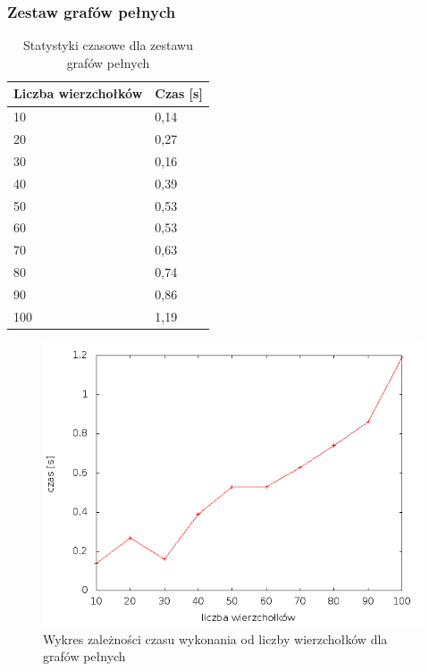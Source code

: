 \documentclass[12pt, a4paper]{article}
\begin{document}
\subsubsection*{Zestaw grafów pełnych}
\begin{table}[H]
\caption{Statystyki czasowe dla zestawu grafów pełnych}
\begin{center}
    \begin{tabular}{|l|l|}
    \hline
    Liczba wierzchołków & Czas [s] \\ \hline
    10 & 0,14 \\ \hline
    20 & 0,27 \\ \hline
    30 & 0,16 \\ \hline
    40 & 0,39 \\ \hline
    50 & 0,53 \\ \hline
    60 & 0,53 \\ \hline
    70 & 0,63 \\ \hline
    80 & 0,74 \\ \hline
    90 & 0,86 \\ \hline
    100 & 1,19 \\ \hline
    \end{tabular}
\end{center}
\end{table}

\begin{figure}[h]
    \begin{center}
	\includegraphics[scale=0.5]{results/img/den/den_1.png}
	\caption{Wykres zależności czasu wykonania od liczby wierzchołków dla grafów pełnych}
    \end{center}
\end{figure}
\newpage
\end{document}
